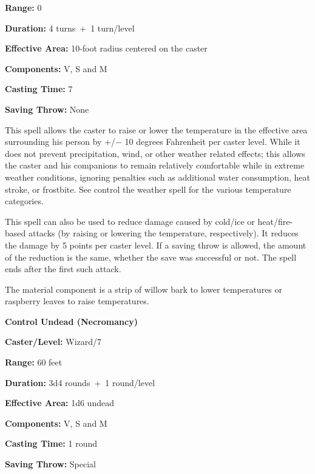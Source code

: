 \begin{multicols}{2}
\begin{minipage}{\columnwidth}
\noindent \textbf{Range:} 0

\noindent \textbf{Duration:} 4 turns~+~1 turn/level

\noindent \textbf{Effective Area:} 10-foot radius centered on the caster

\noindent \textbf{Components:} V, S and M

\noindent \textbf{Casting Time:} 7

\noindent \textbf{Saving Throw:} None

\end{minipage}

This spell allows the caster to raise or lower the temperature in the effective area surrounding his person by +/$-$ 10 degrees Fahrenheit per caster level.  While it does not prevent precipitation, wind, or other weather related effects; this allows the caster and his companions to remain relatively comfortable while in extreme weather conditions, ignoring penalties such as additional water consumption, heat stroke, or frostbite.  See control the weather spell for the various temperature categories. 

This spell can also be used to reduce damage caused by cold/ice or heat/fire-based attacks (by raising or lowering the temperature, respectively).  It reduces the damage by 5 points per caster level.  If a saving throw is allowed, the amount of the reduction is the same, whether the save was successful or not.  The spell ends after the first such attack.

The material component is a strip of willow bark to lower temperatures or raspberry leaves to raise temperatures.

\vspace{1em}

\noindent
\begin{minipage}{\columnwidth}

\noindent \textbf{Control Undead (Necromancy)}

\noindent \textbf{Caster/Level:} Wizard/7

\noindent \textbf{Range:} 60 feet

\noindent \textbf{Duration:} 3d4 rounds~+~1 round/level

\noindent \textbf{Effective Area:} 1d6 undead

\noindent \textbf{Components:} V, S and M

\noindent \textbf{Casting Time:} 1 round

\noindent \textbf{Saving Throw:} Special


\end{minipage}
\end{multicols}
